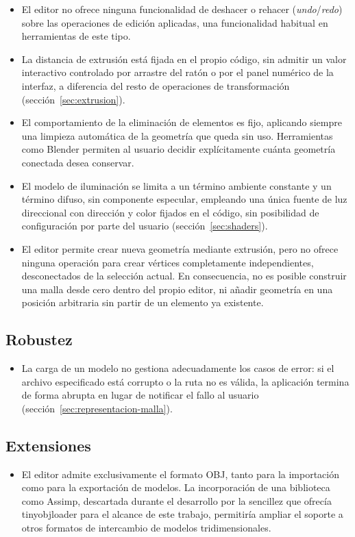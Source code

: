 \begin{itemize}
    \item El editor no ofrece ninguna funcionalidad de deshacer o rehacer (\emph{undo}/\emph{redo}) sobre las operaciones de edición aplicadas, una funcionalidad habitual en herramientas de este tipo.
    \item La distancia de extrusión está fijada en el propio código, sin admitir un valor interactivo controlado por arrastre del ratón o por el panel numérico de la interfaz, a diferencia del resto de operaciones de transformación (sección~\ref{sec:extrusion}).
    \item El comportamiento de la eliminación de elementos es fijo, aplicando siempre una limpieza automática de la geometría que queda sin uso. Herramientas como Blender permiten al usuario decidir explícitamente cuánta geometría conectada desea conservar.
    \item El modelo de iluminación se limita a un término ambiente constante y un término difuso, sin componente especular, empleando una única fuente de luz direccional con dirección y color fijados en el código, sin posibilidad de configuración por parte del usuario (sección~\ref{sec:shaders}).
    \item El editor permite crear nueva geometría mediante extrusión, pero no ofrece ninguna operación para crear vértices completamente independientes, desconectados de la selección actual. En consecuencia, no es posible construir una malla desde cero dentro del propio editor, ni añadir geometría en una posición arbitraria sin partir de un elemento ya existente.
\end{itemize}

\subsection{Robustez}

\begin{itemize}
    \item La carga de un modelo no gestiona adecuadamente los casos de error: si el archivo especificado está corrupto o la ruta no es válida, la aplicación termina de forma abrupta en lugar de notificar el fallo al usuario (sección~\ref{sec:representacion-malla}).
\end{itemize}

\subsection{Extensiones}

\begin{itemize}
    \item El editor admite exclusivamente el formato OBJ, tanto para la importación como para la exportación de modelos. La incorporación de una biblioteca como Assimp, descartada durante el desarrollo por la sencillez que ofrecía tinyobjloader para el alcance de este trabajo, permitiría ampliar el soporte a otros formatos de intercambio de modelos tridimensionales.
\end{itemize}